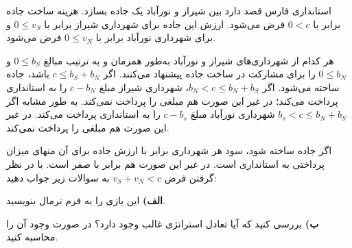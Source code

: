 استانداری فارس قصد دارد بین شیراز و نورآباد یک جاده بسازد. هزینه ساخت جاده برابر با
$0 < c$
فرض می‌شود. ارزش این جاده برای شهرداری شیراز برابر با
$0 \leq v_S$
و برای شهرداری نورآباد برابر با
$0 \leq v_N$
فرض می‌شود.
\vspace{2pt}

هر کدام از شهرداری‌های شیراز و نورآباد به‌طور همزمان و به ترتیب مبالغ
$0 \leq b_S$
و
$0 \leq b_N$
را برای مشارکت در ساخت جاده پیشنهاد می‌کنند. اگر
$c \leq b_S + b_N$
باشد، جاده ساخته می‌شود. اگر
$b_N < c \leq b_N + b_S$،
شهرداری شیراز مبلغ
$c - b_N$
را به استانداری پرداخت می‌کند؛ در غیر این صورت هم مبلغی را پرداخت نمی‌کند. به طور مشابه اگر
$b_s < c \leq b_N + b_S$
شهرداری نورآباد مبلغ
$c - b_s$
را به استانداری پرداخت می‌کند. در غیر این صورت هم مبلغی را پرداخت نمی‌کند.
\vspace{2pt}

اگر جاده ساخته شود، سود هر شهرداری برابر با ارزش جاده برای آن منهای میزان پرداختی به استانداری است. در غیر این صورت هم برابر با صفر است. با در نظر گرفتن فرض
$v_S + v_N < c$
به سوالات زیر جواب دهید:

\vspace{10pt}

\textbf{الف)}
این بازی را به فرم نرمال بنویسید.
\vspace{5pt}

\textbf{ب)}
بررسی کنید که آیا تعادل استراتژی غالب وجود دارد؟ در صورت وجود آن را محاسبه کنید.